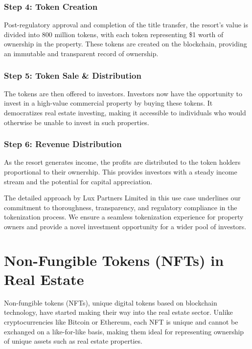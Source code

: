 \documentclass[11pt]{article}
\begin{document}
\subsubsection{Step 4: Token Creation}

Post-regulatory approval and completion of the title transfer, the resort's value is divided into 800 million tokens, with each token representing \$1 worth of ownership in the property. These tokens are created on the blockchain, providing an immutable and transparent record of ownership.


\subsubsection{Step 5: Token Sale \& Distribution}

The tokens are then offered to investors. Investors now have the opportunity to invest in a high-value commercial property by buying these tokens. It democratizes real estate investing, making it accessible to individuals who would otherwise be unable to invest in such properties.


\subsubsection{Step 6: Revenue Distribution}

As the resort generates income, the profits are distributed to the token holders proportional to their ownership. This provides investors with a steady income stream and the potential for capital appreciation.


The detailed approach by Lux Partners Limited in this use case underlines our commitment to thoroughness, transparency, and regulatory compliance in the tokenization process. We ensure a seamless tokenization experience for property owners and provide a novel investment opportunity for a wider pool of investors.


\section{Non-Fungible Tokens (NFTs) in Real Estate}

Non-fungible tokens (NFTs), unique digital tokens based on blockchain technology, have started making their way into the real estate sector. Unlike cryptocurrencies like Bitcoin or Ethereum, each NFT is unique and cannot be exchanged on a like-for-like basis, making them ideal for representing ownership of unique assets such as real estate properties.
\end{document}
